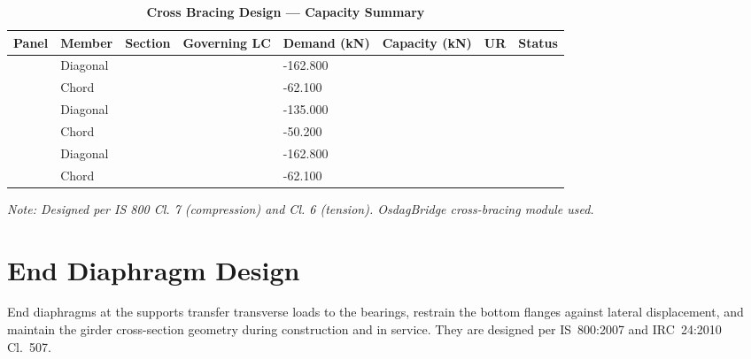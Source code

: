 \documentclass[12pt,a4paper]{report}
\numberwithin{table}{chapter}
\numberwithin{figure}{chapter}
\begin{document}
\vspace{1em}
\begin{longtable}{|C{2.0cm}|L{1.8cm}|C{2.2cm}|C{3.0cm}|C{1.8cm}|C{1.8cm}|C{1.2cm}|C{1.8cm}|}
\caption{\textbf{Cross Bracing Design --- Capacity Summary}}
\hline
\textbf{Panel} & \textbf{Member} & \textbf{Section} & \textbf{Governing LC} & \textbf{Demand (kN)} & \textbf{Capacity (kN)} & \textbf{UR} & \textbf{Status} \\[6pt]
\hline
{} & Diagonal &  &  & -162.800 &  &  &  \\[6pt]
 & Chord &  &  & -62.100 &  &  &  \\[6pt]
\hline
{} & Diagonal &  &  & -135.000 &  &  &  \\[6pt]
 & Chord &  &  & -50.200 &  &  &  \\[6pt]
\hline
{} & Diagonal &  &  & -162.800 &  &  &  \\[6pt]
 & Chord &  &  & -62.100 &  &  &  \\[6pt]
\hline
\end{longtable}
\noindent\textit{Note: Designed per IS 800 Cl. 7 (compression) and Cl. 6 (tension). OsdagBridge cross-bracing module used.}

\section{End Diaphragm Design}
\label{sec:end-diaphragm}

End diaphragms at the supports transfer transverse loads to the bearings, restrain the bottom flanges against lateral displacement, and maintain the girder cross-section geometry during construction and in service. They are designed per IS~800:2007 and IRC~24:2010 Cl.~507.

\vspace{1em}

\vspace{0.4em}
\noindent
\setlength{\tabcolsep}{4pt}
\setlength{\LTleft}{0pt}
\setlength{\LTright}{\fill}
\end{document}
